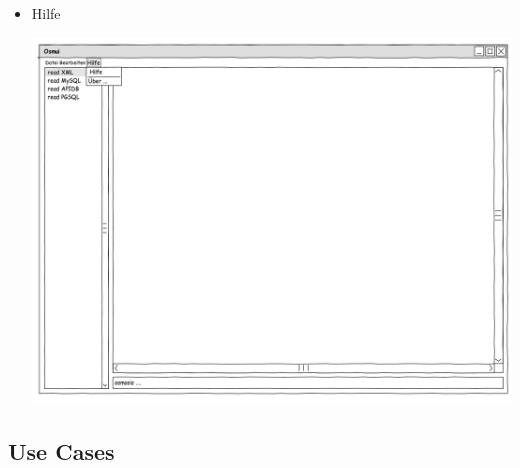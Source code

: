 \documentclass[a4paper,10pt]{scrartcl}
\begin{document}
\begin{itemize}
\begin{center}
\end{center}
\item Hilfe\\
\begin{center}
\includegraphics[width=15cm]{ui_prototype/OsmUi_Hilfe.png}
\end{center}
\end{itemize}

\subsection{Use Cases}
\end{document}
